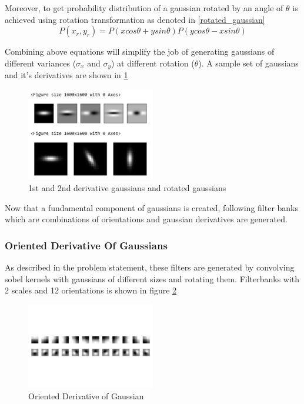\documentclass[conference]{IEEEtran}
\begin{document}
		Moreover, to get probability distribution of a gaussian rotated by an angle of $\theta$ is achieved using rotation transformation as denoted in \ref{rotated_gaussian}
		\begin{equation}
			\label{rotated_gaussian}
			P(x_r,y_r) = P(xcos\theta + ysin\theta)P(ycos\theta - xsin\theta)
		\end{equation}
		
		Combining above equations will simplify the job of generating gaussians of different variances ($\sigma_x$ and $\sigma_y$) at different rotation ($\theta$).  A sample set of gaussians and it's derivatives are shown in \ref{fig:Gaussians}
		
		\begin{figure}[!t]
			\centering
			\captionsetup{justification=centering}
			\includegraphics[width=0.5\textwidth]{filter_banks/gaussians.png}
			\caption{\label{fig:Gaussians}1st and 2nd derivative gaussians and rotated gaussians}
		\end{figure}
	
		Now that a fundamental component of gaussians is created, following filter banks which are combinations of orientations and gaussian derivatives are generated.

		\vspace{0.2cm}
		\subsubsection{Oriented Derivative Of Gaussians}
		As described in the problem statement, these filters are generated by convolving sobel kernels with gaussians of different sizes and rotating them. Filterbanks with 2 scales and 12 orientations is shown in figure \ref{fig:DoG}
		\begin{figure}[]
			\centering
			\includegraphics[width=0.5\textwidth,trim={0cm 3cm 0cm 3cm}]{filter_banks/DoG.png}
			\caption{Oriented Derivative of Gaussian}
			\label{fig:DoG}
		\end{figure}
\end{document}
